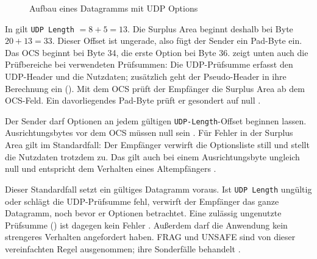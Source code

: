 \begin{figure}[H]
  \caption{Aufbau eines Datagramms mit UDP Options}
  \label{fig:surplus-struktur}
\end{figure}

In  gilt \texttt{UDP Length} $= 8 + 5 = 13$. Die Surplus Area beginnt deshalb bei Byte $20
+ 13 = 33$. Dieser Offset ist ungerade, also fügt der Sender ein Pad-Byte ein. Das OCS beginnt bei Byte 34, die erste
Option bei Byte 36.  zeigt unten auch die Prüfbereiche bei verwendeten Prüfsummen: Die
UDP-Prüfsumme erfasst den UDP-Header und die Nutzdaten; zusätzlich geht der Pseudo-Header in ihre Berechnung ein
(). Mit dem OCS prüft der Empfänger die Surplus Area ab dem OCS-Feld. Ein davorliegendes
Pad-Byte prüft er gesondert auf null \cite[Sec.~8 und 9]{rfc9868}.

Der Sender darf Optionen an jedem gültigen \texttt{UDP-Length}-Offset beginnen lassen. Ausrichtungsbytes
vor dem OCS müssen null sein \cite[Sec.~8]{rfc9868}. Für Fehler in der Surplus Area gilt im Standardfall:
Der Empfänger verwirft die Optionsliste still und stellt die Nutzdaten trotzdem zu. Das gilt auch bei
einem Ausrichtungsbyte ungleich null und entspricht dem Verhalten eines Altempfängers
\cite[Sec.~8 und 14]{rfc9868}.

Dieser Standardfall setzt ein gültiges Datagramm voraus. Ist \texttt{UDP Length} ungültig oder schlägt die
UDP-Prüfsumme fehl, verwirft der Empfänger das ganze Datagramm, noch bevor er Optionen betrachtet. Eine
zulässig ungenutzte Prüfsumme () ist dagegen kein Fehler
\cite[Sec.~10 und 14]{rfc9868}. Außerdem darf die Anwendung kein strengeres Verhalten angefordert haben.
FRAG und UNSAFE sind von dieser vereinfachten Regel ausgenommen; ihre Sonderfälle behandelt
 \cite[Sec.~12 und 14]{rfc9868}.

